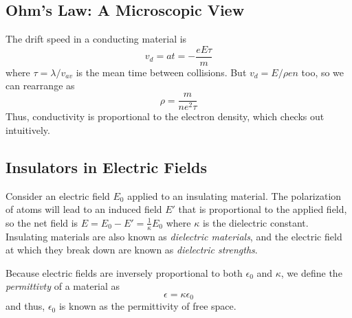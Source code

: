 \documentclass[../PhysicsFormulae.tex]{subfiles}
\begin{document}
\subsection{Ohm's Law: A Microscopic View}
The drift speed in a conducting material is
\[ v_d = at = -\frac{eE\tau}{m} \]
where $\tau = \lambda / v_{av}$ is the mean time between collisions. But $v_d = E/\rho en$ too, so we can rearrange as
\[ \rho = \frac{m}{ne^2 \tau} \]
Thus, conductivity is proportional to the electron density, which checks out intuitively. 

\subsection{Insulators in Electric Fields}
Consider an electric field $E_0$ applied to an insulating material. The polarization of atoms will lead to an induced field $E'$ that is proportional to the applied field, so the net field is 
$E = E_0 - E' = \frac{1}{\kappa} E_0$
where $\kappa$ is the dielectric constant. Insulating materials are also known as \textit{dielectric materials}, and the electric field at which they break down are known as \textit{dielectric strengths}. \bigskip

Because electric fields are inversely proportional to both $\epsilon_0$ and $\kappa$, we define the \textit{permittivty} of a material as 
\[ \epsilon = \kappa \epsilon_0 \]
and thus, $\epsilon_0$ is known as the permittivity of free space. 
\end{document}
